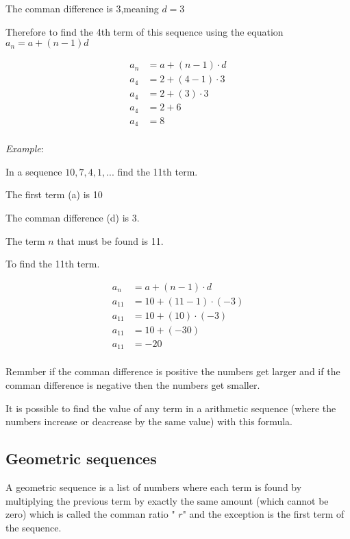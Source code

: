\documentclass[]{book}
\begin{document}
The comman difference is $ 3  $,meaning  $ d = 3  $

Therefore to find the 4th term of this sequence using the equation $ a_{n} = a + (n-1)d$

\begin{align}  
    a_{n} &= a + (n-1) \cdot d  \\
    a_{4} &= 2 + (4-1) \cdot  3  \\
    a_{4} &= 2 + (3) \cdot 3   \\
    a_{4} &= 2 + 6  \\
    a_{4} &= 8  \\
\end{align}  


\vspace{0.5 cm}
\textit{Example}: 

In a sequence $ 10, 7, 4, 1, ...  $ find the 11th term.
 
The first term (a) is 10

The comman difference (d) is 3.

The term $ n  $ that must be found is 11.

To find the 11th term.

\begin{align}
    a_{n} &= a + (n-1) \cdot d \\
    a_{11} &= 10 + (11-1) \cdot (-3 )\\
    a_{11} &= 10 + (10) \cdot (-3) \\
    a_{11} &= 10 + (-30) \\
    a_{11} &= -20 \\
\end{align}

Remmber if the comman difference is positive the numbers get larger and if the comman difference is negative then the numbers get smaller.

It is possible to find the value of any term in a arithmetic sequence (where the numbers increase or deacrease by the same value)
with this formula.

\subsection{Geometric sequences}

A geometric sequence is a list of numbers where each term is found by multiplying the previous term by exactly the same amount
 (which cannot be zero) which is called the comman ratio " $ r  $" and the exception is the first term of the sequence.   
\end{document}
